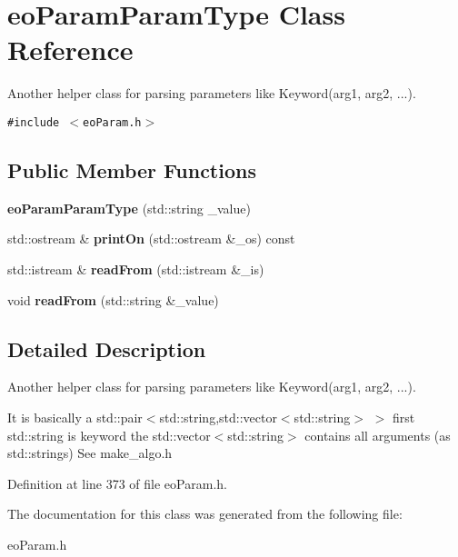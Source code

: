 \section{eo\-Param\-Param\-Type Class Reference}
\label{classeo_param_param_type}
Another helper class for parsing parameters like Keyword(arg1, arg2, ...).  


{\tt \#include $<$eo\-Param.h$>$}

\subsection*{Public Member Functions}
\begin{CompactItemize}
\item 
{\bf eo\-Param\-Param\-Type} (std::string \_\-value)\label{classeo_param_param_type_a0}

\item 
std::ostream \& {\bf print\-On} (std::ostream \&\_\-os) const \label{classeo_param_param_type_a1}

\item 
std::istream \& {\bf read\-From} (std::istream \&\_\-is)\label{classeo_param_param_type_a2}

\item 
void {\bf read\-From} (std::string \&\_\-value)\label{classeo_param_param_type_a3}

\end{CompactItemize}


\subsection{Detailed Description}
Another helper class for parsing parameters like Keyword(arg1, arg2, ...). 

It is basically a std::pair$<$std::string,std::vector$<$std::string$>$ $>$ first std::string is keyword the std::vector$<$std::string$>$ contains all arguments (as std::strings) See make\_\-algo.h 



Definition at line 373 of file eo\-Param.h.

The documentation for this class was generated from the following file:\begin{CompactItemize}
\item 
eo\-Param.h\end{CompactItemize}
